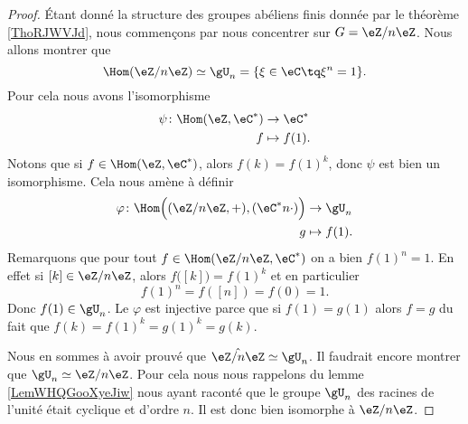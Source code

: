 \begin{proof}
    Étant donné la structure des groupes abéliens finis donnée par le théorème \ref{ThoRJWVJd}, nous commençons par nous concentrer sur \( G=\eZ/n\eZ\). Nous allons montrer que
    \begin{equation}
        \Hom(\eZ/n\eZ)\simeq \gU_n=\{ \xi\in \eC\tq \xi^n=1 \}.
    \end{equation}
    Pour cela nous avons l'isomorphisme
    \begin{equation}
        \begin{aligned}
            \psi\colon \Hom(\eZ,\eC^*)&\to \eC^* \\
            f&\mapsto f(1). 
        \end{aligned}
    \end{equation}
    Notons que si \( f\in \Hom(\eZ,\eC^*)\), alors \( f(k)=f(1)^k\), donc \( \psi\) est bien un isomorphisme. Cela nous amène à définir
    \begin{equation}
        \begin{aligned}
            \varphi\colon \Hom\Big( (\eZ/n\eZ,+),(\eC^*n\cdot) \Big)&\to \gU_n \\
            g&\mapsto f(1). 
        \end{aligned}
    \end{equation}
    Remarquons que pour tout \( f\in\Hom(\eZ/n\eZ,\eC^*)\) on a bien \( f(1)^n=1\). En effet si \( [k]\in \eZ/n\eZ\), alors \( f\big( [k] \big)=f(1)^k\) et en particulier
    \begin{equation}
        f(1)^n=f([n])=f(0)=1.
    \end{equation}
    Donc \( f(1)\in \gU_n\). Le \( \varphi\) est injective parce que si \( f(1)=g(1)\) alors \( f=g\) du fait que \( f(k)=f(1)^k=g(1)^k=g(k)\).

    Nous en sommes à avoir prouvé que \( \hat{\eZ/n\eZ}\simeq \gU_n\). Il faudrait encore montrer que \( \gU_n\simeq \eZ/n\eZ\). Pour cela nous nous rappelons du lemme \ref{LemWHQGooXyeJiw} nous ayant raconté que le groupe \( \gU_n\) des racines de l'unité était cyclique et d'ordre \( n\). Il est donc bien isomorphe à \( \eZ/n\eZ\).


\end{proof}
